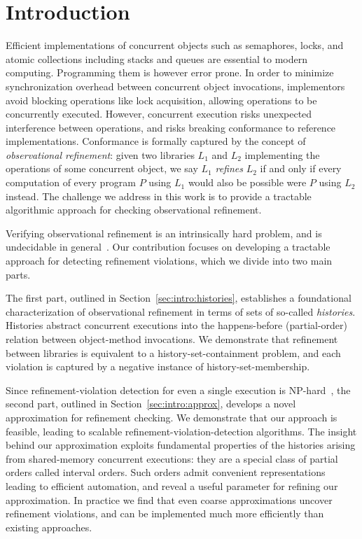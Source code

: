 \section{Introduction}

Efficient implementations of concurrent objects such as semaphores, locks, and
atomic collections including stacks and queues are essential to modern
computing. Programming them is however error prone. In order to minimize
synchronization overhead between concurrent object invocations, implementors
avoid blocking operations like lock acquisition, allowing operations to be
concurrently executed. However, concurrent execution risks unexpected
interference between operations, and risks breaking conformance to reference
implementations. Conformance is formally captured by the concept of
\emph{observational refinement}: given two libraries $L_1$ and $L_2$
implementing the operations of some concurrent object, we say $L_1$
\emph{refines} $L_2$ if and only if every computation of every program $P$
using $L_1$ would also be possible were $P$ using $L_2$ instead. The challenge
we address in this work is to provide a tractable algorithmic approach for
checking observational refinement.

Verifying observational refinement is an intrinsically hard problem, and is
undecidable in general~\cite{conf/esop/BouajjaniEEH13}. Our contribution
focuses on developing a tractable approach for detecting refinement violations,
which we divide into two main parts.

The first part, outlined in Section~\ref{sec:intro:histories}, establishes a
foundational characterization of observational refinement in terms of sets of
so-called \emph{histories}. Histories abstract concurrent executions into the
happens-before (partial-order) relation between object-method invocations. We
demonstrate that refinement between libraries is equivalent to a
history-set-containment problem, and each violation is captured by a negative
instance of history-set-membership.

Since refinement-violation detection for even a single execution is
NP-hard~\cite{journals/siamcomp/GibbonsK97}, the second part, outlined in
Section~\ref{sec:intro:approx}, develops a novel approximation for refinement
checking. We demonstrate that our approach is feasible, leading to scalable
refinement-violation-detection algorithms. The insight behind our approximation
exploits fundamental properties of the histories arising from shared-memory
concurrent executions: they are a special class of partial orders called
interval orders. Such orders admit convenient representations leading to
efficient automation, and reveal a useful parameter for refining our
approximation. In practice we find that even coarse approximations uncover
refinement violations, and can be implemented much more efficiently than
existing approaches.


